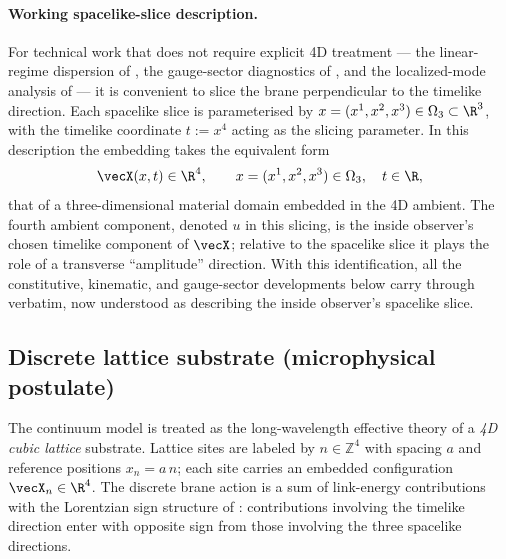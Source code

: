 \paragraph{Working spacelike-slice description.}
For technical work that does not require explicit 4D treatment --- the linear-regime dispersion of , the gauge-sector diagnostics of , and the localized-mode analysis of  --- it is convenient to slice the brane perpendicular to the timelike direction.
Each spacelike slice is parameterised by $x=(x^1,x^2,x^3)\in\Omega_3\subset\R^3$, with the timelike coordinate $t:=x^4$ acting as the slicing parameter.
In this description the embedding takes the equivalent form
\begin{equation}
  \vecX(x,t)\in\R^4,
  \qquad x=(x^1,x^2,x^3)\in\Omega_3,\quad t\in\R,
  \label{eq:fundamental-field-sliced}
\end{equation}
that of a three-dimensional material domain embedded in the 4D ambient.
The fourth ambient component, denoted $u$ in this slicing, is the inside observer's chosen timelike component of $\vecX$; relative to the spacelike slice it plays the role of a transverse ``amplitude'' direction.
With this identification, all the constitutive, kinematic, and gauge-sector developments below carry through verbatim, now understood as describing the inside observer's spacelike slice.

\subsection{Discrete lattice substrate (microphysical postulate)}
\label{subsec:lattice-substrate}

The continuum model is treated as the long-wavelength effective theory of a \emph{4D cubic lattice} substrate.
Lattice sites are labeled by $n\in\mathbb{Z}^4$ with spacing $a$ and reference positions $x_n=a\,n$; each site carries an embedded configuration $\vecX_n\in\R^4$.
The discrete brane action is a sum of link-energy contributions with the Lorentzian sign structure of : contributions involving the timelike direction enter with opposite sign from those involving the three spacelike directions.

